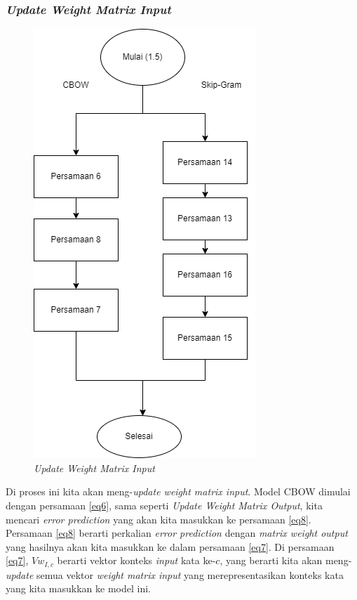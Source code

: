 \documentclass[12pt]{report}
\begin{document}
\subsubsection{\textit{Update Weight Matrix Input}}
\begin{figure}[H]
\centering
\includegraphics[scale=0.75]{updateweightinputrev2}
\caption{\textit{Update Weight Matrix Input}}
\label{updateweightinput}
\end{figure}
Di proses ini kita akan meng-\textit{update weight matrix input}. Model CBOW dimulai dengan persamaan \eqref{eq6}, sama seperti \textit{Update Weight Matrix Output}, kita mencari \textit{error prediction} yang akan kita masukkan ke persamaan \eqref{eq8}. Persamaan \eqref{eq8} berarti perkalian \textit{error prediction} dengan \textit{matrix weight output} yang hasilnya akan kita masukkan ke dalam persamaan \eqref{eq7}. Di persamaan \eqref{eq7}, $Vw_{I,c}$ berarti vektor konteks \textit{input} kata ke-$c$, yang berarti kita akan meng-\textit{update} semua vektor \textit{weight matrix input} yang merepresentasikan konteks kata yang kita masukkan ke model ini. 
\end{document}
